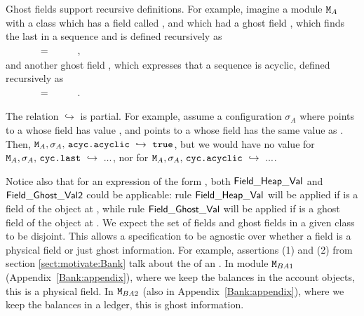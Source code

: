 Ghost fields support recursive definitions. For example, imagine a module ${\mbox{\tt{\ensuremath{{\mbox{\tt{M}}}}}}}_A$ with
a class  which has a field called , and which 
had a ghost field , which finds  the last  in a sequence
and is defined recursively as \\
$~ \strut \hspace{.1cm}$ \ \ \ \ \ =\   \  \  \ ,\\
and another ghost field , which expresses that a sequence is acyclic,
defined recursively as \\
$~ \strut \hspace{.1cm}$ \ \ \ \ \ =\   \  \  \ .

The relation $ \hookrightarrow$ is partial. 
For example, assume   a configuration
$\sigma_A$ where
 points to a  whose field  has value , and   
 points to a  whose field  has the same value as . Then,   
$\M_A,\sigma_A,\,\prg{acyc.acyclic}  \ \hookrightarrow\  \prg{true}$, but we would have no value for 
$\M_A,\sigma_A,\, \prg{cyc.last}  \ \hookrightarrow\  ...$, nor for
$\M_A,\sigma_A,\, \prg{cyc.acyclic}  \ \hookrightarrow\  ...$.


Notice also that for an expression of the form  
, both ${\sf {Field\_Heap\_Val}}$ and ${\sf {Field\_Ghost\_Val2}}$ could be applicable: rule ${\sf {Field\_Heap\_Val}}$
will be applied if  is a field of the object at , while rule ${\sf {Field\_Ghost\_Val}}$
will be applied if  is a ghost field of the object at . We expect the set of fields and ghost fields in a 
given class to be disjoint.
This allows a specification to be agnostic over whether a field is a physical field or just ghost information.
For example, assertions (1) and (2) from  section  \ref{sect:motivate:Bank}
 talk about the  of an . 
In module ${\mbox{\tt{\ensuremath{{\mbox{\tt{M}}}}}}}_{BA1}$ (Appendix~\ref{Bank:appendix}), where we keep the balances in the account objects, this is a physical field. 
In ${\mbox{\tt{\ensuremath{{\mbox{\tt{M}}}}}}}_{BA2}$ (also in Appendix~\ref{Bank:appendix}), where we keep the
balances in a ledger, this is ghost information.  

